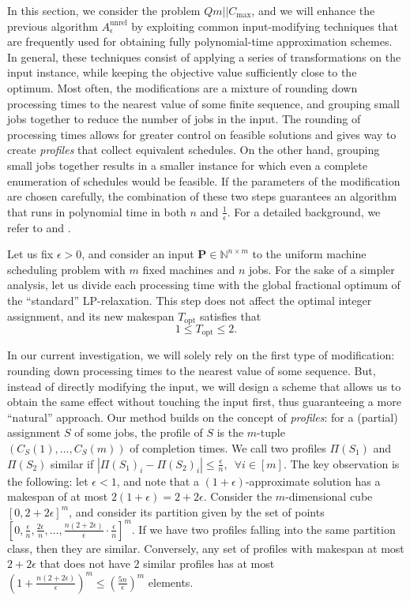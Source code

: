 \documentclass[a4paper,UKenglish,cleveref, autoref, thm-restate, pdfa]{lipics-v2021}
\theoremstyle{plain}
\begin{document}
In this section, we consider the problem $Qm||C_{\text{max}}$, and we will enhance the previous algorithm $A^{\text{unrel}}_{\epsilon}$ by exploiting common input-modifying techniques that are frequently used for obtaining fully polynomial-time approximation schemes. In general, these techniques consist of applying a series of transformations on the input instance, while keeping the objective value sufficiently close to the optimum. Most often, the modifications are a mixture of rounding down processing times to the nearest value of some finite sequence, and grouping small jobs together to reduce the number of jobs in the input. The rounding of processing times allows for greater control on feasible solutions and gives way to create \emph{profiles} that collect equivalent schedules. On the other hand, grouping small jobs together results in a smaller instance for which even a complete enumeration of schedules would be feasible. If the parameters of the modification are chosen carefully, the combination of these two steps guarantees an algorithm that runs in polynomial time in both $n$ and $\frac{1}{\epsilon}$. For a detailed background, we refer to \cite{grouping_1} and \cite{grouping_2}.

Let us fix $\epsilon > 0$, and consider an input $\bm{P} \in \mathbb{N}^{n \times m}$ to the uniform machine scheduling problem with $m$ fixed machines and $n$ jobs. For the sake of a simpler analysis, let us divide each processing time with the global fractional optimum of the ``standard'' LP-relaxation. This step does not affect the optimal integer assignment, and its new makespan $T_{\text{opt}}$ satisfies that 
\[
1 \le T_{\text{opt}} \le 2.
\]

In our current investigation, we will solely rely on the first type of modification: rounding down processing times to the nearest value of some sequence. But, instead of directly modifying the input, we will design a scheme that allows us to obtain the same effect without touching the input first, thus guaranteeing a more ``natural'' approach. Our method builds on the concept of  
\emph{profiles}: for a (partial) assignment $S$ of some jobs, the profile of $S$ is the $m$-tuple $(C_S(1), \ldots, C_S(m))$ of completion times. We call two profiles $\Pi(S_1)$ and $\Pi(S_2)$ similar if $|\Pi(S_1)_i - \Pi(S_2)_i| \le \frac{\epsilon}{n}, \,\,\,\forall i \in [m]$. The key observation is the following: let $\epsilon < 1$, and note that a $(1+\epsilon)$-approximate solution has a makespan of at most $2(1+\epsilon)= 2 + 2\epsilon$. Consider the $m$-dimensional cube $[0,2+2\epsilon]^m$, and consider its partition given by the set of points $[0,\frac{\epsilon}{n}, \frac{2\epsilon}{n}, \ldots, \frac{n(2+2\epsilon)}{\epsilon}\cdot \frac{\epsilon}{n}]^m$. If we have two profiles falling into the same partition class, then they are similar. Conversely, any set of profiles with makespan at most $2+2\epsilon$ that does not have $2$ similar profiles has at most $\left(1+\frac{n(2+2\epsilon)}{\epsilon}\right)^m \le \left(\frac{5n}{\epsilon}\right)^m$ elements.
\end{document}

